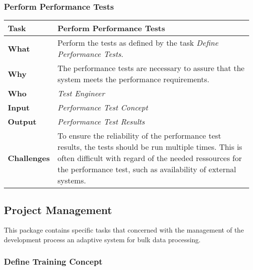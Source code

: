 \subsubsection{Perform Performance Tests}
\begin{tabularx}{\textwidth}{@{} l X @{}}
	\caption{Perform Performance Tests} \label{table:ch6_Task_Perform_Performance_Tests}\\
	\toprule 
	\bfseries Task & Perform Performance Tests\\
	\midrule 
	\bfseries What & Perform the tests as defined by the task \emph{Define Performance Tests}.\\
	\midrule 
	\bfseries Why & The performance tests are necessary to assure that the system meets the performance requirements.\\
	\midrule 
	\bfseries Who & \emph{Test Engineer}\\
	\midrule 
	\bfseries Input & \emph{Performance Test Concept}\\
	\midrule 
	\bfseries Output & \emph{Performance Test Results}\\
	\midrule 
	\bfseries Challenges & To ensure the reliability of the performance test results, the tests should be run multiple times. This is often difficult with regard of the needed ressources for the performance test, such as availability of external systems.\\
	\bottomrule 
\end{tabularx}

\subsection{Project Management}
This package contains specific tasks that concerned with the management of the development process an adaptive system for bulk data processing. 

\subsubsection{Define Training Concept}

